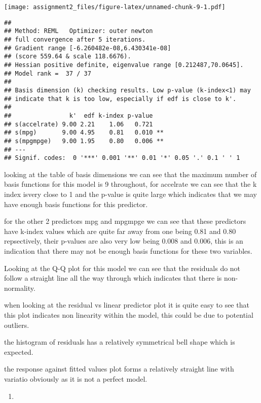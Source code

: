 \documentclass[]{article}
\begin{document}
\texttt{[image: assignment2\_files/figure-latex/unnamed-chunk-9-1.pdf]}

\begin{verbatim}
## 
## Method: REML   Optimizer: outer newton
## full convergence after 5 iterations.
## Gradient range [-6.260482e-08,6.430341e-08]
## (score 559.64 & scale 118.6676).
## Hessian positive definite, eigenvalue range [0.212487,70.0645].
## Model rank =  37 / 37 
## 
## Basis dimension (k) checking results. Low p-value (k-index<1) may
## indicate that k is too low, especially if edf is close to k'.
## 
##                k'  edf k-index p-value   
## s(accelrate) 9.00 2.21    1.06   0.721   
## s(mpg)       9.00 4.95    0.81   0.010 **
## s(mpgmpge)   9.00 1.95    0.80   0.006 **
## ---
## Signif. codes:  0 '***' 0.001 '**' 0.01 '*' 0.05 '.' 0.1 ' ' 1
\end{verbatim}

looking at the table of basis dimensions we can see that the maximum
number of basis functions for this model is 9 throughout, for accelrate
we can see that the k index isvery close to 1 and the p-value is quite
large which indicates that we may have enough basis functions for this
predictor.

for the other 2 predictors mpg and mpgmpge we can see that these
predictors have k-index values which are quite far away from one being
0.81 and 0.80 repsectively, their p-values are also very low being 0.008
and 0.006, this is an indication that there may not be enough basis
functions for these two variables.

Looking at the Q-Q plot for this model we can see that the residuals do
not follow a straight line all the way through which indicates that
there is non-normality.

when looking at the residual vs linear predictor plot it is quite easy
to see that this plot indicates non linearity within the model, this
could be due to potential outliers.

the histogram of residuals has a relatively symmetrical bell shape which
is expected.

the response against fitted values plot forms a relatively straight line
with variatio obviously as it is not a perfect model.

\begin{enumerate}
\def\labelenumi{\alph{enumi})}
\setcounter{enumi}{7}
\item
\end{enumerate}
\end{document}
